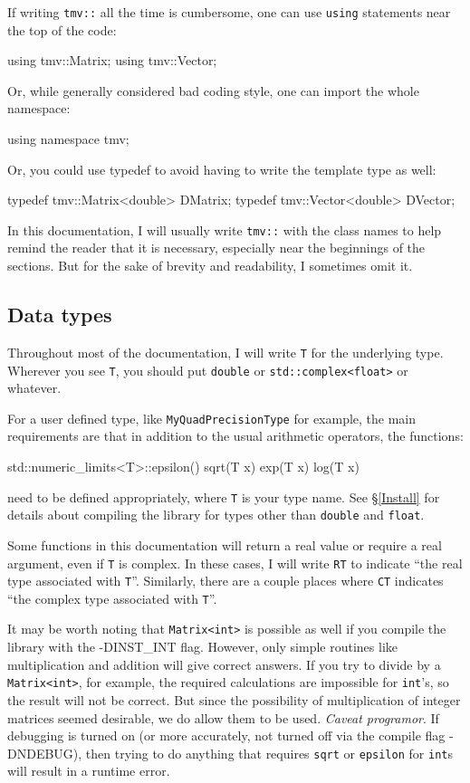 \documentclass[twoside,letterpaper,11pt]{article}
\renewcommand{\tt}[1]{{\lstinline {#1}}}
\begin{document}
If writing \tt{tmv::} all the time is cumbersome, one can use \tt{using}
statements near the top of the code:
\begin{tmvcode}
using tmv::Matrix;
using tmv::Vector;
\end{tmvcode}
Or, while generally considered bad coding style, one can import the whole namespace:
\begin{tmvcode}
using namespace tmv;
\end{tmvcode}
Or, you could use typedef to avoid having to write the template type as well:
\begin{tmvcode}
typedef tmv::Matrix<double> DMatrix;
typedef tmv::Vector<double> DVector;
\end{tmvcode}
In this documentation, I will usually write \tt{tmv::} with the class names to help remind the reader
that it is necessary, especially near the 
beginnings of the sections.  
But for the sake of brevity and readability, I sometimes omit it.

\subsection {Data types}

Throughout most of the documentation, I will write \tt{T} for the underlying type.
Wherever you see \tt{T}, you should put \tt{double} or \tt{std::complex<float>} or whatever.

For a user defined type, like \tt{MyQuadPrecisionType} for example, the main requirements are that 
in addition to the usual arithmetic operators, the functions:
\begin{tmvcode}
std::numeric_limits<T>::epsilon()
sqrt(T x) 
exp(T x) 
log(T x)
\end{tmvcode}
need to be defined appropriately, where \tt{T} is your type name.  See \S\ref{Install} for details about
compiling the library for types other than \tt{double} and \tt{float}.

Some functions in this documentation will return a real value or require a real argument, 
even if \tt{T} is complex.  In these cases, I will write \tt{RT} to indicate 
``the real type associated with \tt{T}''.  Similarly, there are a couple places where \tt{CT}
indicates ``the complex type associated with \tt{T}''.

It may be worth noting that \tt{Matrix<int>} is possible as well if you compile the library
with the -DINST\_INT flag. 
However, only simple 
routines like multiplication and addition will give correct answers.  If you try to 
divide by a \tt{Matrix<int>}, for example, the required calculations are impossible 
for \tt{int}'s,
so the result will not be correct.  But since the possibility of multiplication of 
integer matrices seemed desirable, we do allow them to be used.  
\emph{Caveat programor}.  If debugging is turned on (or more accurately, not
turned off via the compile flag -DNDEBUG), then trying to do anything that requires
\tt{sqrt} or \tt{epsilon} for \tt{int}s will result in a runtime error.
\end{document}
